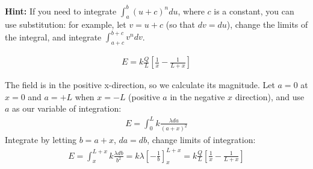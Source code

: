 \textbf{Hint:} If you need to integrate $\int_a^b (u+c)^n du$, where $c$ is a constant, you can use substitution: for example, let $v = u+c$ (so that $dv=du$), change the limits of the integral, and integrate $\int_{a+c}^{b+c}v^ndv$.
\begin{finalanswer}
\begin{align*}
E = k\frac{Q}{L}\left[\frac{1}{x}-\frac{1}{L+x}\right]
\end{align*}
\end{finalanswer}
\begin{solution}
The field is in the positive x-direction, so we calculate its magnitude. Let $a=0$ at $x=0$ and $a=+L$ when $x=-L$ (positive $a$ in the negative $x$ direction), and use $a$ as our variable of integration:
\begin{align*}
E = \int_{0}^{L}k\frac{\lambda da}{(a+x)^2}
\end{align*}
Integrate by letting $b=a+x$, $da=db$, change limits of integration:
\begin{align*}
E = \int_{x}^{L+x}k\frac{\lambda db}{b^2}=k\lambda \left[-\frac{1}{b}\right]_{x}^{L+x}=k\frac{Q}{L}\left[\frac{1}{x}-\frac{1}{L+x}\right]
\end{align*}

\end{solution}




